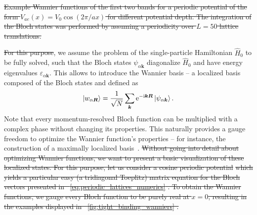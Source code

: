 \documentclass{svmono}
\def\ri{\mathrm i}
\def\re{\mathrm e}
\newcommand{\brlr}[1]{\left( #1 \right)}
\providecommand{\DIFaddtex}[1]{{\protect\color{blue}\uwave{#1}}} %
\providecommand{\DIFdeltex}[1]{{\protect\color{red}\sout{#1}}}                      %
\providecommand{\DIFaddbegin}{} %
\providecommand{\DIFaddend}{} %
\providecommand{\DIFdelbegin}{} %
\providecommand{\DIFdelend}{} %
\providecommand{\DIFdelFL}[1]{\DIFdel{#1}} %
\providecommand{\DIFadd}[1]{\texorpdfstring{\DIFaddtex{#1}}{#1}} %
\providecommand{\DIFdel}[1]{\texorpdfstring{\DIFdeltex{#1}}{}} %
\newcommand{\DIFscaledelfig}{0.5}
\newlength{\DIFdelgraphicswidth} %
\newlength{\DIFdelgraphicsheight} %
\newcommand{\DIFaddincludegraphics}[2][]{{\color{blue}\fbox{\DIFOincludegraphics[#1]{#2}}}} %
\newcommand{\DIFdelincludegraphics}[2][]{%
\sbox{\DIFdelgraphicsbox}{\DIFOincludegraphics[#1]{#2}}%
\settoboxwidth{\DIFdelgraphicswidth}{\DIFdelgraphicsbox} %
\settoboxtotalheight{\DIFdelgraphicsheight}{\DIFdelgraphicsbox} %
\scalebox{\DIFscaledelfig}{%
\parbox[b]{\DIFdelgraphicswidth}{\usebox{\DIFdelgraphicsbox}\\[-\baselineskip] \rule{\DIFdelgraphicswidth}{0em}}\llap{\resizebox{\DIFdelgraphicswidth}{\DIFdelgraphicsheight}{%
\setlength{\unitlength}{\DIFdelgraphicswidth}%
\begin{picture}(1,1)%
\thicklines\linethickness{2pt} %
{\color[rgb]{1,0,0}\put(0,0){\framebox(1,1){}}}%
{\color[rgb]{1,0,0}\put(0,0){\line( 1,1){1}}}%
{\color[rgb]{1,0,0}\put(0,1){\line(1,-1){1}}}%
\end{picture}%
}\hspace*{3pt}}} %
} %
\DeclareRobustCommand{\DIFaddbegin}{\DIFOaddbegin \let\includegraphics\DIFaddincludegraphics} %
\DeclareRobustCommand{\DIFaddend}{\DIFOaddend \let\includegraphics\DIFOincludegraphics} %
\DeclareRobustCommand{\DIFdelbegin}{\DIFOdelbegin \let\includegraphics\DIFdelincludegraphics} %
\DeclareRobustCommand{\DIFdelend}{\DIFOaddend \let\includegraphics\DIFOincludegraphics} %
\begin{document}
\DIFdelbegin %
{%
\DIFdelFL{Example Wannier functions of the first two bands for a periodic potential of the form $V_{ae}(x)=V_0\cos(2\pi/ax)$ for different potential depth. The integration of the Bloch states was performed by assuming a periodicity over $L=50$ lattice translations.}}

\DIFdel{For this purpose}\DIFdelend \DIFaddbegin \DIFadd{Here}\DIFaddend , we assume the problem of the single-particle Hamiltonian $\hat H_0$ to be fully solved, such that the Bloch states $\psi_{\alpha{\bm k}}$ diagonalize $\hat H_0$ and have energy eigenvalues $\varepsilon_{\alpha{\bm k}}$.
This allows to introduce the Wannier basis -- a localized basis composed of the Bloch states and defined as
\begin{align}
    \ket{w_{\alpha{\bm R}}} = \frac1{\sqrt N}\sum_{\bm k}\re^{-\ri{\bm k}{\bm R}}\ket{\psi_{\alpha{\bm k}}}.
    \label{eq:wannier_states}
\end{align}
Note that every momentum-resolved Bloch function can be multiplied with a complex phase without changing its properties.
This naturally provides a gauge freedom to optimize the Wannier function's properties -- for instance, the construction of a maximally localized basis~\cite{Marzari2012}.
\DIFdelbegin \DIFdel{Without going into detail about optimizing Wannier functions, we want to present a basic visualization of these localized states.
For this purpose, let us consider a cosine periodic potential
}%
\DIFdel{which yields a particular easy (a tridiagonal Toeplitz) matrix equation for the Bloch vectors presented in \mbox{%
\cref{eq:periodic_lattices_numerics}}\hspace{0pt}%
.
To obtain the Wannier functions, we gauge every Bloch function to be purely real at $x=0$, resulting in the examples displayed in \mbox{%
\cref{fig:tight_binding_wanniers}}\hspace{0pt}%
.
}\DIFdelend 
\end{document}

